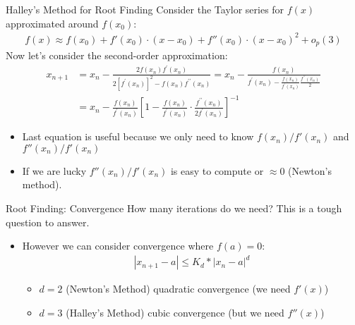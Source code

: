 \documentclass[xcolor=pdftex,dvipsnames,table,mathserif,aspectratio=169]{beamer}
\begin{document}
\begin{frame}{Halley's Method for Root Finding}
Consider the Taylor series for $f(x)$ approximated around $f(x_0)$:
\begin{align*}
f(x) \approx f(x_0) + f'(x_0) \cdot (x-x_0) + f''(x_0) \cdot (x-x_0)^2 + o_p(3)
\end{align*}
Now let's consider the second-order approximation:
\begin{align*}
x_{n+1}
&=x_{n}-\frac{2 f\left(x_{n}\right) f^{\prime}\left(x_{n}\right)}{2\left[f^{\prime}\left(x_{n}\right)\right]^{2}-f\left(x_{n}\right) f^{\prime \prime}\left(x_{n}\right)}
=x_{n}-\frac{f\left(x_{n}\right)}{f^{\prime}\left(x_{n}\right)-\frac{f\left(x_{n}\right)}{f^{\prime}\left(x_{n}\right)} \frac{f^{\prime \prime}\left(x_{n}\right)}{2}}\\
&=x_{n}-\frac{f\left(x_{n}\right)}{f^{\prime}\left(x_{n}\right)}\left[1-\frac{f\left(x_{n}\right)}{f^{\prime}\left(x_{n}\right)} \cdot \frac{f^{\prime \prime}\left(x_{n}\right)}{2 f^{\prime}\left(x_{n}\right)}\right]^{-1}
\end{align*}
\vspace{-.4cm}
\begin{itemize}
\item Last equation is useful because we only need to know $f(x_n)/f'(x_n)$ and $f''(x_n)/f'(x_n)$
\item If we are lucky $f''(x_n)/f'(x_n)$ is easy to compute or $\approx 0$ (Newton's method).
\end{itemize}
\end{frame}

\begin{frame}{Root Finding: Convergence}
How many iterations do we need? This is a tough question to answer.
\begin{itemize}
\item However we can consider convergence where $f(a) =0$:
\begin{align*}
\left|x_{n+1}-a\right| \leq K_d *\left|x_{n}-a\right|^{d}
\end{align*}
\begin{itemize}
\item $d=2$ (Newton's Method) \alert{quadratic convergence}  (we need $f'(x)$)
\item $d=3$ (Halley's Method) \alert{cubic convergence} (but we need $f''(x)$)
\end{itemize}
\end{itemize}
\end{frame}
\end{document}
